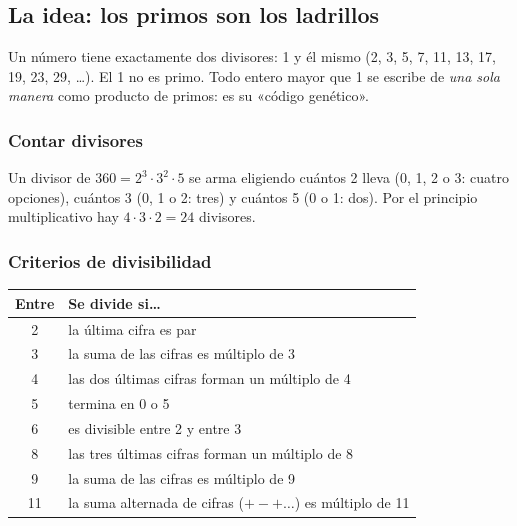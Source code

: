 

\subsection{La idea: los primos son los ladrillos}
Un número  tiene exactamente dos divisores: 1 y él mismo (2, 3, 5, 7, 11, 13, 17, 19, 23, 29, …). El 1 no
es primo. Todo entero mayor que 1 se escribe de \emph{una sola manera} como producto de primos: es su «código genético».


\subsubsection{Contar divisores}
Un divisor de $360 = 2^3 \cdot 3^2 \cdot 5$ se arma eligiendo cuántos 2 lleva (0, 1, 2 o 3: cuatro opciones), cuántos 3
(0, 1 o 2: tres) y cuántos 5 (0 o 1: dos). Por el principio multiplicativo hay $4 \cdot 3 \cdot 2 = 24$ divisores.

\subsubsection{Criterios de divisibilidad}
\begin{center}\small
\begin{tabular}{@{}cl@{}}
\toprule
\textbf{Entre} & \textbf{Se divide si…}\\\midrule
2 & la última cifra es par\\
3 & la suma de las cifras es múltiplo de 3\\
4 & las dos últimas cifras forman un múltiplo de 4\\
5 & termina en 0 o 5\\
6 & es divisible entre 2 y entre 3\\
8 & las tres últimas cifras forman un múltiplo de 8\\
9 & la suma de las cifras es múltiplo de 9\\
11 & la suma alternada de cifras ($+ - + \ldots$) es múltiplo de 11\\
\bottomrule
\end{tabular}
\end{center}

